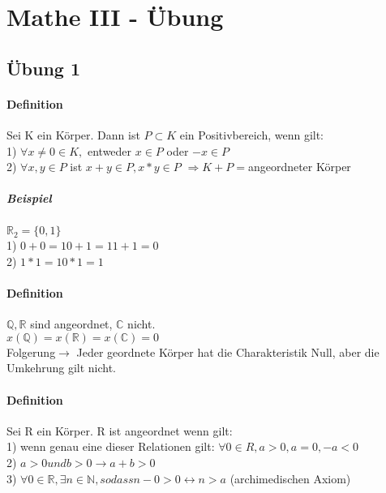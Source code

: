 \documentclass[10pt,a4paper,draft]{scrartcl}
\begin{document}
\section*{Mathe III - Übung}

\subsection*{Übung 1}

\paragraph*{Definition}
\begin{tabbing}
Sei K ein Körper. Dann ist $P\subset K$ ein Positivbereich, wenn gilt:\\
1) $ \forall x \neq 0\in K,$ entweder $x\in P$ oder $-x\in P$\\
2) $\forall x,y\in P$ ist $x + y\in P, x * y\in P$ $\Rightarrow K + P = $angeordneter 					Körper
\end{tabbing}
	
\subparagraph*{Beispiel} 
\begin{tabbing}
$\mathbb{R}_{2}=\{0,1\}$\\
1) $0 + 0=1 0 + 1=1 1 + 1=0$\\ 
2) $1 * 1=1 0 * 1=1$\\	
\end{tabbing}

\paragraph*{Definition}
\begin{tabbing}
$\mathbb{Q},\mathbb{R}$ sind angeordnet, $\mathbb{C}$ nicht.\\
$x(\mathbb{Q})=x(\mathbb{R})=x(\mathbb{C})=0$\\
Folgerung$\rightarrow$ Jeder geordnete Körper hat die Charakteristik Null, aber die Umkehrung gilt nicht. 
\end{tabbing}
	
\paragraph*{Definition}
\begin{tabbing}
Sei R ein Körper. R ist angeordnet wenn  gilt:\\
1) wenn genau eine dieser Relationen gilt: $\forall 0\in R, a > 0, a = 0, -a < 0$\\
2) $a > 0 und b > 0\rightarrow a + b > 0$\\
3) $\forall 0\in \mathbb{R}, \exists n\in \mathbb{N}, sodass n - 0 > 0 \leftrightarrow n > a$ (archimedischen Axiom)\\
\end{tabbing}	
\end{document}
